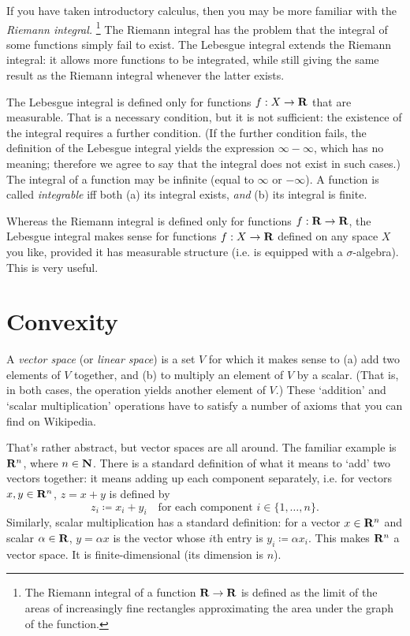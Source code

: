 \documentclass[11pt,letterpaper,reqno,oneside]{book}
\begin{document}
\begin{appendices}
If you have taken introductory calculus, then you may be more familiar with the \emph{Riemann integral.}%
	\footnote{The Riemann integral of a function $\mathbf{R} \to \mathbf{R}$ is defined as the limit of the areas of increasingly fine rectangles approximating the area under the graph of the function.}
The Riemann integral has the problem that the integral of some functions simply fail to exist.
The Lebesgue integral extends the Riemann integral:
it allows more functions to be integrated,
while still giving the same result as the Riemann integral whenever the latter exists.

The Lebesgue integral is defined only for functions $f : X \to \mathbf{R}$ that are measurable.
That is a necessary condition, but it is not sufficient:
the existence of the integral requires a further condition.
(If the further condition fails, the definition of the Lebesgue integral yields the expression $\infty - \infty$, which has no meaning; therefore we agree to say that the integral does not exist in such cases.)
The integral of a function may be infinite (equal to $\infty$ or $-\infty$).
A function is called \emph{integrable} iff both (a) its integral exists, \emph{and} (b) its integral is finite.

Whereas the Riemann integral is defined only for functions $f : \mathbf{R} \to \mathbf{R}$,
the Lebesgue integral makes sense for functions $f : X \to \mathbf{R}$
defined on any space $X$ you like, provided it has measurable structure (i.e. is equipped with a $\sigma$-algebra).
This is very useful.




\chapter{Convexity}
\label{ch:convexity}

A \emph{vector space} (or \emph{linear space}) is a set $V$ for which it makes sense to (a) add two elements of $V$ together, and (b) to multiply an element of $V$ by a scalar. (That is, in both cases, the operation yields another element of $V$.)
These `addition' and `scalar multiplication' operations have to satisfy a number of axioms that you can find on Wikipedia.

That's rather abstract, but vector spaces are all around.
The familiar example is $\mathbf{R}^n$, where $n \in \mathbf{N}$.
There is a standard definition of what it means to `add' two vectors together: it means adding up each component separately, i.e. for vectors $x,y \in \mathbf{R}^n$, $z = x+y$ is defined by
%
\begin{equation*}
	z_i \coloneqq x_i + y_i
	\quad \text{for each component $i \in \{1,\dots,n\}$.}
\end{equation*}
%
Similarly, scalar multiplication has a standard definition:
for a vector $x \in \mathbf{R}^n$ and scalar $\alpha \in \mathbf{R}$, $y = \alpha x$ is the vector whose $i$th entry is $y_i \coloneqq \alpha x_i$.
This makes $\mathbf{R}^n$ a vector space.
It is finite-dimensional (its dimension is $n$).


\end{appendices}
\end{document}
